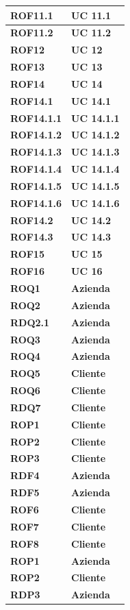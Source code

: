 \begin{longtable}{ |p{3cm}|p{3cm}|  }
    \textbf{ROF11.1} &  \textbf{UC 11.1} \\ \hline
    \textbf{ROF11.2} &  \textbf{UC 11.2} \\ \hline
    \textbf{ROF12} &    \textbf{UC 12} \\ \hline
    \textbf{ROF13} &    \textbf{UC 13} \\ \hline
    \textbf{ROF14} &    \textbf{UC 14} \\ \hline
    \textbf{ROF14.1} &  \textbf{UC 14.1} \\ \hline
    \textbf{ROF14.1.1} & \textbf{UC 14.1.1}\\ \hline
    \textbf{ROF14.1.2} & \textbf{UC 14.1.2}\\ \hline
    \textbf{ROF14.1.3} & \textbf{UC 14.1.3}\\ \hline
    \textbf{ROF14.1.4} & \textbf{UC 14.1.4} \\ \hline
    \textbf{ROF14.1.5} & \textbf{UC 14.1.5} \\ \hline
    \textbf{ROF14.1.6} & \textbf{UC 14.1.6} \\ \hline
    \textbf{ROF14.2} &   \textbf{UC 14.2} \\ \hline
    \textbf{ROF14.3} &   \textbf{UC 14.3} \\ \hline
    \textbf{ROF15} &     \textbf{UC 15} \\ \hline
    \textbf{ROF16} &     \textbf{UC 16} \\ \hline
    \textbf{ROQ1} &      \textbf{Azienda} \\ \hline
    \textbf{ROQ2} &      \textbf{Azienda} \\ \hline
    \textbf{RDQ2.1} &    \textbf{Azienda} \\ \hline
    \textbf{ROQ3} & \textbf{Azienda} \\ \hline
    \textbf{ROQ4} & \textbf{Azienda} \\ \hline
    \textbf{ROQ5} & \textbf{Cliente} \\ \hline
    \textbf{ROQ6} & \textbf{Cliente} \\ \hline
    \textbf{RDQ7} & \textbf{Cliente} \\ \hline
    \textbf{ROP1} & \textbf{Cliente} \\ \hline
    \textbf{ROP2} & \textbf{Cliente} \\ \hline
    \textbf{ROP3} & \textbf{Cliente} \\ \hline
    \textbf{RDF4} & \textbf{Azienda} \\ \hline
    \textbf{RDF5} & \textbf{Azienda} \\ \hline
    \textbf{ROF6} & \textbf{Cliente} \\ \hline
    \textbf{ROF7} & \textbf{Cliente} \\ \hline
    \textbf{ROF8} & \textbf{Cliente}\\ \hline
    \textbf{ROP1} & \textbf{Azienda} \\ \hline
    \textbf{ROP2} & \textbf{Cliente} \\ \hline
    \textbf{RDP3} & \textbf{Azienda} \\ \hline
\end{longtable}


